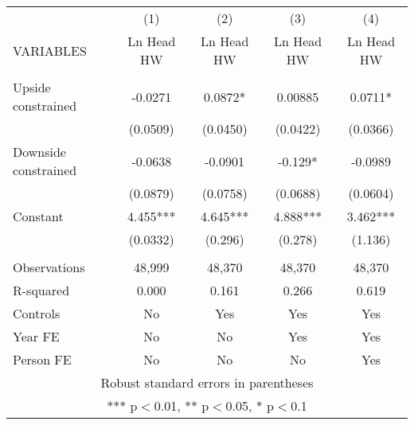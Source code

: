 \begin{tabular}{lcccc} \hline
 & (1) & (2) & (3) & (4) \\
VARIABLES & Ln Head HW & Ln Head HW & Ln Head HW & Ln Head HW \\ \hline
 &  &  &  &  \\
Upside constrained & -0.0271 & 0.0872* & 0.00885 & 0.0711* \\
 & (0.0509) & (0.0450) & (0.0422) & (0.0366) \\
Downside constrained & -0.0638 & -0.0901 & -0.129* & -0.0989 \\
 & (0.0879) & (0.0758) & (0.0688) & (0.0604) \\
Constant & 4.455*** & 4.645*** & 4.888*** & 3.462*** \\
 & (0.0332) & (0.296) & (0.278) & (1.136) \\
 &  &  &  &  \\
Observations & 48,999 & 48,370 & 48,370 & 48,370 \\
R-squared & 0.000 & 0.161 & 0.266 & 0.619 \\
Controls & No & Yes & Yes & Yes \\
Year FE & No & No & Yes & Yes \\
 Person FE & No & No & No & Yes \\ \hline
\multicolumn{5}{c}{ Robust standard errors in parentheses} \\
\multicolumn{5}{c}{ *** p$<$0.01, ** p$<$0.05, * p$<$0.1} \\
\end{tabular}

